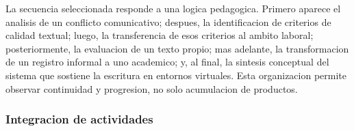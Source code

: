 \documentclass[
	spanish,
	letterpaper, oneside
]{article}
\begin{document}
La secuencia seleccionada responde a una logica pedagogica. Primero aparece el analisis de un conflicto comunicativo; despues, la identificacion de criterios de calidad textual; luego, la transferencia de esos criterios al ambito laboral; posteriormente, la evaluacion de un texto propio; mas adelante, la transformacion de un registro informal a uno academico; y, al final, la sintesis conceptual del sistema que sostiene la escritura en entornos virtuales. Esta organizacion permite observar continuidad y progresion, no solo acumulacion de productos.

\subsubsection{Integracion de actividades}

\begingroup
\small
\setlength{\tabcolsep}{5pt}
\renewcommand{\arraystretch}{1.28}
\end{document}
